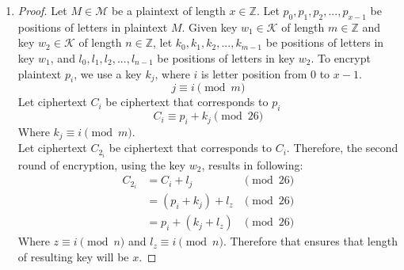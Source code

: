 \documentclass[11pt]{article}
\newcommand{\K}{\mathcal{K}}
\newcommand{\M}{\mathcal{M}}
\newcommand{\Z}{\mathbb{Z}}
\theoremstyle{definition}
\begin{document}
\begin{enumerate}
  \item
    \begin{proof}
      Let $M \in \M$ be a plaintext of length $x \in \Z$. Let $p_0, p_1, p_2, ...,p_{x - 1}$ be positions of letters in plaintext $M$. Given key $w_1 \in \K$ of length $m \in \Z$ and key $w_2 \in \K$ of length $n \in \Z$, let $k_0, k_1, k_2, ...,k_{m - 1}$ be positions of letters in key $w_1$, and $l_0, l_1, l_2, ...,l_{n - 1}$ be positions of letters in key $w_2$. To encrypt plaintext $p_i$, we use a key $k_j$, where $i$ is letter position from $0$ to $x - 1$.
      \[
        j \equiv i \pmod m
      \]
      Let ciphertext $C_i$ be ciphertext that corresponds to $p_i$
      \[
        C_i \equiv p_i + k_j \pmod {26}
      \]
      Where $k_j \equiv i \pmod m$. \\
      Let ciphertext $C_{2_i}$ be ciphertext that corresponds to $C_i$. Therefore, the second round of encryption, using the key $w_2$, results in following:
      \begin{equation*}
      \begin{aligned}
        C_{2_i} &= C_i + l_j &\pmod {26} \\
                &= (p_i + k_j) + l_z &\pmod {26} \\
                &= p_i + (k_j + l_z) &\pmod {26}
      \end{aligned}
      \end{equation*}
      Where $z \equiv i \pmod n$ and $l_z \equiv i \pmod n$. Therefore that ensures that length of resulting key will be $x$.
    \end{proof}
\end{enumerate}

\newpage
\end{document}
